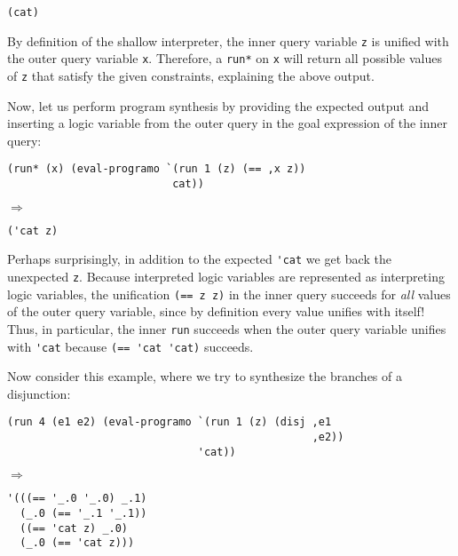 \begin{Verbatim}
(cat)
\end{Verbatim}
\smallskip

By definition of the shallow interpreter, the inner query variable \Verb|z| is
unified with the outer query variable \Verb|x|. Therefore, a \Verb|run*| on
\Verb|x| will return all possible values of \Verb|z| that satisfy the given
constraints, explaining the above output.

Now, let us perform program synthesis by providing the expected output and
inserting a logic variable from the outer query in the goal expression of the
inner query:

\begin{Verbatim}
(run* (x) (eval-programo `(run 1 (z) (== ,x z))
                          cat))
\end{Verbatim}
$\Rightarrow$

\begin{Verbatim}
('cat z)
\end{Verbatim}
\smallskip

Perhaps surprisingly, in addition to the expected \Verb|'cat| we get back the
unexpected \Verb|z|. Because interpreted logic variables are represented as
interpreting logic variables, the unification \Verb|(== z z)| in the inner query
succeeds for \textit{all} values of the outer query variable, since by
definition every value unifies with itself! Thus, in particular, the inner
\Verb|run| succeeds when the outer query variable unifies with \Verb|'cat|
because \Verb|(== 'cat 'cat)| succeeds.

Now consider this example, where we try to synthesize the branches of a
disjunction:

\begin{Verbatim}
(run 4 (e1 e2) (eval-programo `(run 1 (z) (disj ,e1
                                                ,e2))
                              'cat))
\end{Verbatim}
$\Rightarrow$

\begin{Verbatim}
'(((== '_.0 '_.0) _.1)
  (_.0 (== '_.1 '_.1))
  ((== 'cat z) _.0)
  (_.0 (== 'cat z)))
\end{Verbatim}
\smallskip

